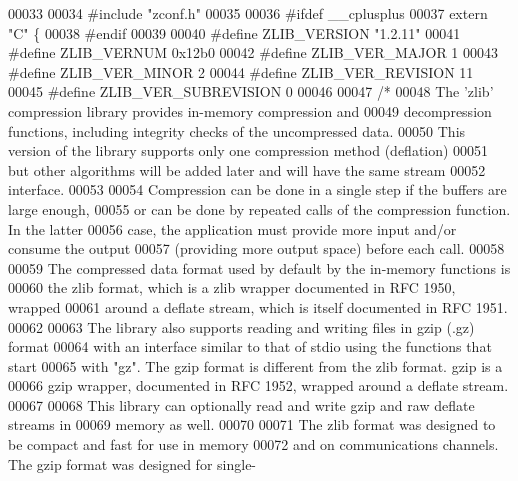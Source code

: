 \begin{DoxyCode}
00033 
00034 \textcolor{preprocessor}{#include "zconf.h"}
00035 
00036 \textcolor{preprocessor}{#ifdef \_\_cplusplus}
00037 \textcolor{keyword}{extern} \textcolor{stringliteral}{"C"} \{
00038 \textcolor{preprocessor}{#endif}
00039 
00040 \textcolor{preprocessor}{#define ZLIB\_VERSION "1.2.11"}
00041 \textcolor{preprocessor}{#define ZLIB\_VERNUM 0x12b0}
00042 \textcolor{preprocessor}{#define ZLIB\_VER\_MAJOR 1}
00043 \textcolor{preprocessor}{#define ZLIB\_VER\_MINOR 2}
00044 \textcolor{preprocessor}{#define ZLIB\_VER\_REVISION 11}
00045 \textcolor{preprocessor}{#define ZLIB\_VER\_SUBREVISION 0}
00046 
00047 \textcolor{comment}{/*}
00048 \textcolor{comment}{    The 'zlib' compression library provides in-memory compression and}
00049 \textcolor{comment}{  decompression functions, including integrity checks of the uncompressed data.}
00050 \textcolor{comment}{  This version of the library supports only one compression method (deflation)}
00051 \textcolor{comment}{  but other algorithms will be added later and will have the same stream}
00052 \textcolor{comment}{  interface.}
00053 \textcolor{comment}{}
00054 \textcolor{comment}{    Compression can be done in a single step if the buffers are large enough,}
00055 \textcolor{comment}{  or can be done by repeated calls of the compression function.  In the latter}
00056 \textcolor{comment}{  case, the application must provide more input and/or consume the output}
00057 \textcolor{comment}{  (providing more output space) before each call.}
00058 \textcolor{comment}{}
00059 \textcolor{comment}{    The compressed data format used by default by the in-memory functions is}
00060 \textcolor{comment}{  the zlib format, which is a zlib wrapper documented in RFC 1950, wrapped}
00061 \textcolor{comment}{  around a deflate stream, which is itself documented in RFC 1951.}
00062 \textcolor{comment}{}
00063 \textcolor{comment}{    The library also supports reading and writing files in gzip (.gz) format}
00064 \textcolor{comment}{  with an interface similar to that of stdio using the functions that start}
00065 \textcolor{comment}{  with "gz".  The gzip format is different from the zlib format.  gzip is a}
00066 \textcolor{comment}{  gzip wrapper, documented in RFC 1952, wrapped around a deflate stream.}
00067 \textcolor{comment}{}
00068 \textcolor{comment}{    This library can optionally read and write gzip and raw deflate streams in}
00069 \textcolor{comment}{  memory as well.}
00070 \textcolor{comment}{}
00071 \textcolor{comment}{    The zlib format was designed to be compact and fast for use in memory}
00072 \textcolor{comment}{  and on communications channels.  The gzip format was designed for single-}

\end{DoxyCode}
